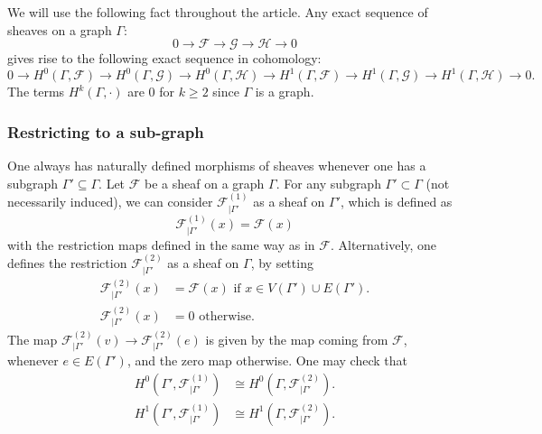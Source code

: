 \documentclass{article}
\theoremstyle{definition}
\theoremstyle{remark}
\begin{document}
We will use the following fact throughout the article. Any exact sequence of sheaves on a graph $\Gamma:$
\begin{equation*}
    0\rightarrow \mathcal{F} \rightarrow \mathcal{G}\rightarrow \mathcal{H} \rightarrow 0
\end{equation*}
gives rise to the following exact sequence in cohomology:
\begin{equation*}
    0 \rightarrow H^0(\Gamma, \mathcal{F}) \rightarrow H^0(\Gamma, \mathcal{G})\rightarrow H^0(\Gamma, \mathcal{H})\rightarrow H^1(\Gamma, \mathcal{F})\rightarrow H^1(\Gamma, \mathcal{G})\rightarrow H^1(\Gamma, \mathcal{H})\rightarrow 0.
\end{equation*} 
The terms $H^{k}(\Gamma, \cdot)$ are $0$ for $k\geq 2$ since $\Gamma$ is a graph.
\subsubsection{Restricting to a sub-graph}
One always has naturally defined morphisms of sheaves whenever one has a subgraph $\Gamma' \subseteq \Gamma$. Let $\mathcal{F}$ be a sheaf on a graph $\Gamma$. For any subgraph $\Gamma'\subset \Gamma$ (not necessarily induced), we can consider $\mathcal{F}^{(1)}_{\vert \Gamma'}$ as a sheaf on $\Gamma'$, which is defined as
\begin{equation}
\mathcal{F}^{(1)}_{\vert \Gamma'}(x) = \mathcal{F}(x)
\end{equation}
with the restriction maps defined in the same way as in $\mathcal{F}$. Alternatively, one defines the restriction $\mathcal{F}^{(2)}_{\vert \Gamma'}$ as a sheaf on $\Gamma$, by setting
\begin{align*}
\mathcal{F}_{\vert \Gamma'}^{(2)}(x) &= \mathcal{F}(x) \text{ if $x\in V(\Gamma') \cup  E(\Gamma').$}
\\
\mathcal{F}_{\vert \Gamma'}^{(2)}(x) &= 0 \text{ otherwise}.
\end{align*}
The map $\mathcal{F}^{(2)}_{\vert \Gamma'}(v) \rightarrow \mathcal{F}^{(2)}_{\vert \Gamma'}(e)$ is given by the map coming from $\mathcal{F}$, whenever $e\in E(\Gamma')$, and the zero map otherwise. One may check that 
\begin{align*}
H^{0}(\Gamma', \mathcal{F}^{(1)}_{\vert \Gamma'}) &\cong H^{0}(\Gamma, \mathcal{F}^{(2)}_{\vert \Gamma'}). \\
H^{1}(\Gamma', \mathcal{F}^{(1)}_{\vert \Gamma'}) &\cong H^{1}(\Gamma, \mathcal{F}^{(2)}_{\vert \Gamma'}).
\end{align*}  
\end{document}
